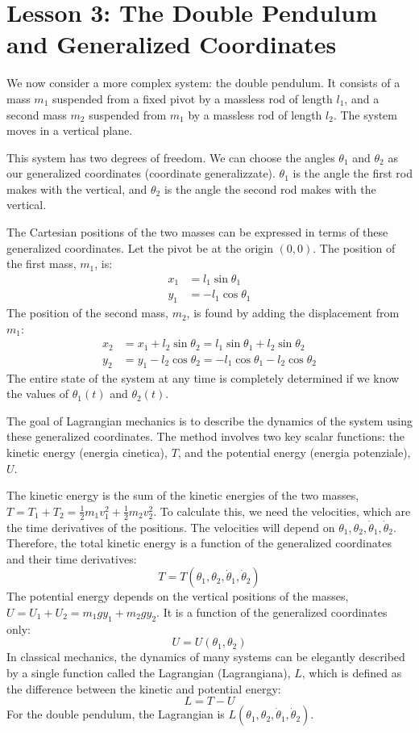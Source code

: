 \section*{Lesson 3: The Double Pendulum and Generalized Coordinates}

We now consider a more complex system: the double pendulum. It consists of a mass $m_1$ suspended from a fixed pivot by a massless rod of length $l_1$, and a second mass $m_2$ suspended from $m_1$ by a massless rod of length $l_2$. The system moves in a vertical plane.

This system has two degrees of freedom. We can choose the angles $\theta_1$ and $\theta_2$ as our generalized coordinates (coordinate generalizzate). $\theta_1$ is the angle the first rod makes with the vertical, and $\theta_2$ is the angle the second rod makes with the vertical.

The Cartesian positions of the two masses can be expressed in terms of these generalized coordinates. Let the pivot be at the origin $(0,0)$.
The position of the first mass, $m_1$, is:
\begin{align*}
    x_1 &= l_1\sin\theta_1 \\
    y_1 &= -l_1\cos\theta_1
\end{align*}
The position of the second mass, $m_2$, is found by adding the displacement from $m_1$:
\begin{align*}
    x_2 &= x_1 + l_2\sin\theta_2 = l_1\sin\theta_1 + l_2\sin\theta_2 \\
    y_2 &= y_1 - l_2\cos\theta_2 = -l_1\cos\theta_1 - l_2\cos\theta_2
\end{align*}
The entire state of the system at any time is completely determined if we know the values of $\theta_1(t)$ and $\theta_2(t)$.

The goal of Lagrangian mechanics is to describe the dynamics of the system using these generalized coordinates. The method involves two key scalar functions: the kinetic energy (energia cinetica), $T$, and the potential energy (energia potenziale), $U$.

The kinetic energy is the sum of the kinetic energies of the two masses, $T = T_1 + T_2 = \frac{1}{2}m_1v_1^2 + \frac{1}{2}m_2v_2^2$. To calculate this, we need the velocities, which are the time derivatives of the positions. The velocities will depend on $\theta_1, \theta_2, \dot{\theta}_1, \dot{\theta}_2$. Therefore, the total kinetic energy is a function of the generalized coordinates and their time derivatives:
\[
    T = T(\theta_1, \theta_2, \dot{\theta}_1, \dot{\theta}_2)
\]
The potential energy depends on the vertical positions of the masses, $U = U_1 + U_2 = m_1gy_1 + m_2gy_2$. It is a function of the generalized coordinates only:
\[
    U = U(\theta_1, \theta_2)
\]
In classical mechanics, the dynamics of many systems can be elegantly described by a single function called the Lagrangian (Lagrangiana), $L$, which is defined as the difference between the kinetic and potential energy:
\[
    L = T - U
\]
For the double pendulum, the Lagrangian is $L(\theta_1, \theta_2, \dot{\theta}_1, \dot{\theta}_2)$.

